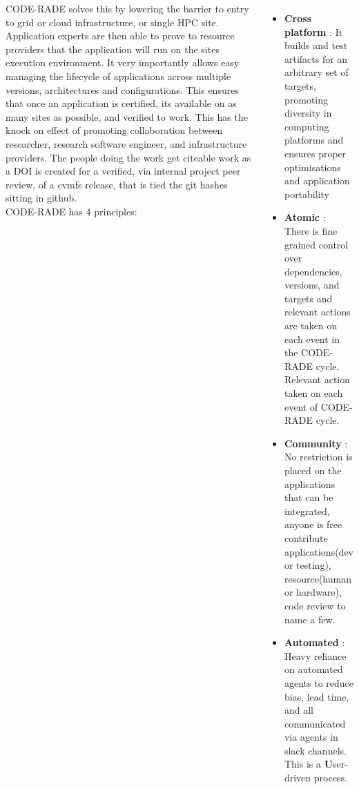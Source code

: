 \documentclass[20pt, a0paper, landscape, margin=0mm, innermargin=15mm,
     blockverticalspace=10mm, colspace=5mm, subcolspace=8mm]{tikzposter} %
\begin{document}
\begin{columns}
{             CODE-RADE solves this by lowering the barrier to entry to grid or cloud infrastructure, or single HPC site. 
                  Application experts are then able to prove to resource providers that the application will run on the sites execution environment. 
                  It very importantly allows easy  managing the lifecycle of applications across multiple versions, architectures and configurations. 
                  This ensures that once an application is certified, its available on as many sites as possible, and verified to work.
                  This has the knock on effect of promoting collaboration between researcher, research software engineer, and infrastructure providers. 
                  The people doing the work get citeable work as a DOI is created for a verified, via internal project peer review, of a cvmfs release, that is tied the git hashes sitting in github. 
         \vspace{2cm}\\
         CODE-RADE has 4 principles:
         \begin{itemize}
                 \item \textbf{Cross platform} : It builds and test artifacts for an arbitrary set of targets, promoting diversity in computing platforms and ensures proper optimisations and application portability 
                \item \textbf{Atomic} :
                                 There is fine grained control over dependencies, versions, and targets and relevant actions are taken on each event in the CODE-RADE cycle. \\
                                 Relevant action taken on each event of CODE-RADE cycle. 
                  \item \textbf{Community} :
                      No restriction is placed on the applications that can be integrated, anyone is free contribute applications(dev or testing), resource(human or hardware), code review to name a few. 
                  \item \textbf{Automated} :
                                 Heavy reliance on automated agents to reduce bias, lead time, and all communicated via agents in slack channels. This is a \textbf User-driven process. 
             \end{itemize}

}
\end{columns}
\end{document}
